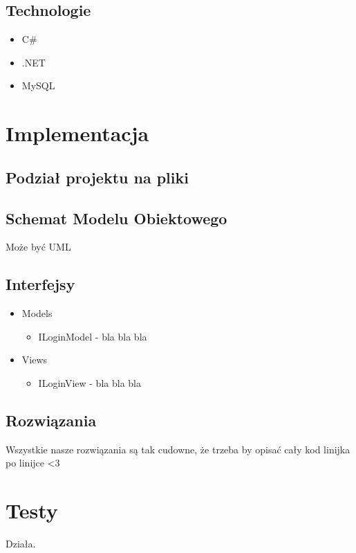 \documentclass[12pt,a4paper]{article}
\begin{document}
			\subsection{Technologie}
			\begin{itemize}
			\item C\#
			\item .NET
			\item MySQL
			\end{itemize}
	
	\section{Implementacja}
		\subsection{Podział projektu na pliki}
		
			
		\subsection{Schemat Modelu Obiektowego}
			Może być UML		
		\subsection{Interfejsy}
			\begin{itemize}
				\item Models
				\begin{itemize}
					\item ILoginModel - bla bla bla
				\end{itemize}
				\item Views
				\begin{itemize}
					\item ILoginView - bla bla bla
				\end{itemize}
			\end{itemize}
		\subsection{Rozwiązania}
			Wszystkie nasze rozwiązania są tak cudowne, że trzeba by opisać cały kod linijka po linijce <3
	\section{Testy}
		Działa. 
\end{document}
